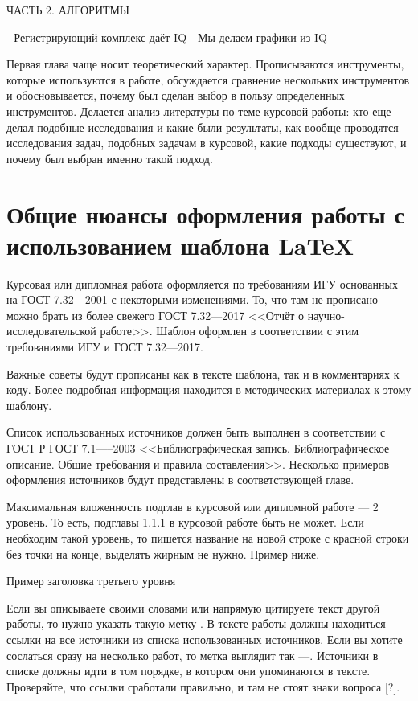 \documentclass{report}
\begin{document}
ЧАСТЬ 2. АЛГОРИТМЫ

- Регистрирующий комплекс даёт IQ
- Мы делаем графики из IQ

Первая глава чаще носит теоретический характер. Прописываются инструменты, которые используются в работе, обсуждается сравнение нескольких инструментов и обосновывается, почему был сделан выбор в пользу определенных инструментов. Делается анализ литературы по теме курсовой работы: кто еще делал подобные исследования и какие были результаты, как вообще проводятся исследования задач, подобных задачам в курсовой, какие подходы существуют, и почему был выбран именно такой подход.

\section{Общие нюансы оформления работы с использованием шаблона \LaTeX}
Курсовая или дипломная работа оформляется по требованиям ИГУ основанных на ГОСТ 7.32---2001 с некоторыми изменениями. То, что там не прописано можно брать из более свежего ГОСТ 7.32---2017 <<Отчёт о научно-исследовательской работе>>. Шаблон оформлен в соответствии с этим требованиями ИГУ и ГОСТ 7.32---2017. 

Важные советы будут прописаны как в тексте шаблона, так и в комментариях к коду. Более подробная информация находится в методических материалах к этому шаблону.

Список использованных источников должен быть выполнен в соответствии с ГОСТ Р ГОСТ 7.1—--2003 <<Библиографическая запись. Библиографическое описание. Общие требования и правила составления>>. Несколько примеров оформления источников будут представлены в соответствующей главе.

Максимальная вложенность подглав в курсовой или дипломной работе --- 2 уровень. То есть, подглавы 1.1.1 в курсовой работе быть не может. Если необходим такой уровень, то пишется название на новой строке с красной строки без точки на конце, выделять жирным не нужно. Пример ниже.

Пример заголовка третьего уровня

Если вы описываете своими словами или напрямую цитируете текст другой работы, то нужно указать такую метку \cite{bib_gost1}. В тексте работы должны находиться ссылки на все источники из списка использованных источников. Если вы хотите сослаться сразу на несколько работ, то метка выглядит так \cite{bib_gost2}---\cite{bib_electr_res}. Источники в списке должны идти в том порядке, в котором они упоминаются в тексте. Проверяйте, что ссылки сработали правильно, и там не стоят знаки вопроса [?].
\end{document}
